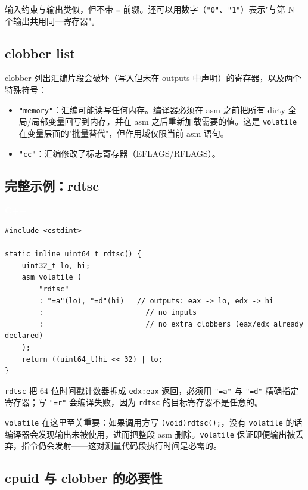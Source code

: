 \documentclass[12pt,a4paper,fontset=fandol]{ctexbook}
\newcommand{\cpplabel}{%
  \begin{tcolorbox}[enhanced,colback=cppheadbg,colframe=cppheadbg,
    arc=1mm,boxrule=0mm,left=6pt,right=6pt,top=2pt,bottom=2pt,
    halign=left,oversize]
    \textcolor{white}{\small\bfseries C++}
  \end{tcolorbox}\vspace{-4pt}}
\newcommand{\kw}[1]{\texttt{#1}}
\begin{document}
输入约束与输出类似，但不带 \texttt{=} 前缀。还可以用数字（\texttt{"0"}、\texttt{"1"}）表示"与第 N 个输出共用同一寄存器"。

\subsection{clobber list}\label{sec:asm-clobbers}

clobber 列出汇编片段会破坏（写入但未在 outputs 中声明）的寄存器，以及两个特殊符号：

\begin{itemize}[nosep]
  \item \texttt{"memory"}：汇编可能读写任何内存。编译器必须在 asm 之前把所有 dirty 全局/局部变量回写到内存，并在 asm 之后重新加载需要的值。这是 \kw{volatile} 在变量层面的"批量替代"，但作用域仅限当前 asm 语句。
  \item \texttt{"cc"}：汇编修改了标志寄存器（EFLAGS/RFLAGS）。
\end{itemize}

\subsection{完整示例：rdtsc}\label{sec:asm-rdtsc}

\cpplabel
\begin{lstlisting}[style=cppstyle]
#include <cstdint>

static inline uint64_t rdtsc() {
    uint32_t lo, hi;
    asm volatile (
        "rdtsc"
        : "=a"(lo), "=d"(hi)   // outputs: eax -> lo, edx -> hi
        :                        // no inputs
        :                        // no extra clobbers (eax/edx already declared)
    );
    return ((uint64_t)hi << 32) | lo;
}
\end{lstlisting}

\texttt{rdtsc} 把 64 位时间戳计数器拆成 \texttt{edx:eax} 返回，必须用 \texttt{"=a"} 与 \texttt{"=d"} 精确指定寄存器；写 \texttt{"=r"} 会编译失败，因为 \texttt{rdtsc} 的目标寄存器不是任意的。

\kw{volatile} 在这里至关重要：如果调用方写 \texttt{(void)rdtsc();}，没有 \kw{volatile} 的话编译器会发现输出未被使用，进而把整段 asm 删除。\kw{volatile} 保证即便输出被丢弃，指令仍会发射——这对测量代码段执行时间是必需的。

\subsection{cpuid 与 clobber 的必要性}\label{sec:asm-cpuid}
\end{document}

